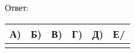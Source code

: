 
Ответ: \sepline \\
\begin{tabular}{|c|c|c|c|c|c|}
\hline
А) & Б) & В) & Г) & Д) & Е/ \\
\hline
\makecell{} & \makecell{} & \makecell{} & \makecell{} & \makecell{} & \makecell{}\\
\hline
\end{tabular}